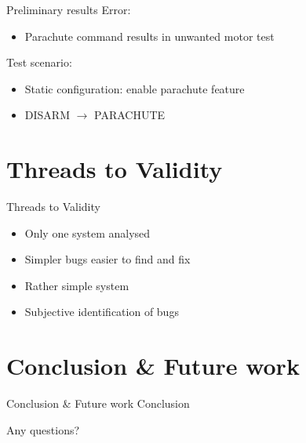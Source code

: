 	\begin{frame}{Preliminary results}
		Error:
		\begin{itemize}
			\item[] Parachute command results in unwanted motor test
		\end{itemize}

		\pause
		Test scenario:
		\begin{itemize}
			\item[] Static configuration: enable parachute feature
			\item[] DISARM $\rightarrow$ PARACHUTE
		\end{itemize}
	\end{frame}

\section{Threads to Validity}
	\begin{frame}{Threads to Validity}
		\begin{itemize}
			\item Only one system analysed
			\item Simpler bugs easier to find and fix
			\item Rather simple system
			\item Subjective identification of bugs
		\end{itemize}
	\end{frame}


\section{Conclusion \& Future work}
	\begin{frame}{Conclusion \& Future work}
		Conclusion
	\end{frame}

\begin{frame}[standout]

	{\Large Any questions?}

\end{frame}





